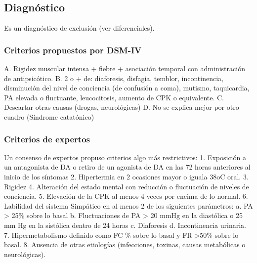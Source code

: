 \subsection*{Diagnóstico}
Es un diagnóstico de exclusión (ver diferenciales).
\subsubsection*{Criterios propuestos por DSM-IV}
A. Rigidez muscular intensa + fiebre + asociación temporal con administración de antipsicótico.
B. 2 o + de: diaforesis, disfagia, temblor, incontinencia, disminución del nivel de conciencia (de confusión a coma), mutismo, taquicardia, PA elevada o fluctuante, leucocitosis, aumento de CPK o equivalente.
C. Descartar otras causas (drogas, neurológicas)
D. No se explica mejor por otro cuadro (Síndrome catatónico)
\subsubsection*{Criterios de expertos}
Un consenso de expertos propuso criterios algo más restrictivos\cite{ware2018neuroleptic}:
1. Exposición a un antagonista de DA o retiro de un agonista de DA en las 72 horas anteriores al inicio de los síntomas
2. Hipertermia en 2 ocasiones mayor o iguala 38oC oral.
3. Rigidez
4. Alteración del estado mental con reducción o fluctuación de niveles de conciencia.
5. Elevación de la CPK al menos 4 veces por encima de lo normal.
6. Labilidad del sistema Simpático en al menos 2 de los siguientes parámetros:
a. PA > 25\% sobre lo basal
b. Fluctuaciones de PA > 20 mmHg en la diastólica o 25 mm Hg en la sistólica dentro de 24 horas
c. Diaforesis
d. Incontinencia urinaria.
7. Hipermetabolismo definido como FC \% sobre lo basal y FR \faArrowUp >50\% sobre lo basal.
8. Ausencia de otras etiologías (infecciones, toxinas, causas metabólicas o neurológicas).
